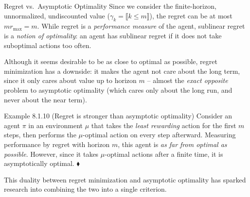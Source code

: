\documentclass[aspectratio=169,10pt]{beamer}
\begin{document}
\begin{frame}{Regret vs.\ Asymptotic Optimality}
  Since we consider the finite-horizon, unnormalized, undiscounted value
  ($\gamma_k=\llbracket k\le m\rrbracket$), the regret can be at most
  $mr_{\max}=m$. While regret is a \emph{performance measure} of the
  agent, sublinear regret is a \emph{notion of optimality}: an agent has
  sublinear regret if it does not take suboptimal actions too often.

  \bigskip
  Although it seems desirable to be as close to optimal as possible, regret
  minimization has a downside: it makes the agent not care about the long
  term, since it only cares about value up to horizon $m$ -- almost the
  \emph{exact opposite} problem to asymptotic optimality (which cares only
  about the long run, and never about the near term).

  \begin{block}{Example 8.1.10 (Regret is stronger than asymptotic optimality)}
    Consider an agent $\pi$ in an environment $\mu$ that takes the
    \emph{least rewarding} action for the first $m$ steps, then performs the
    $\mu$-optimal action on every step afterward. Measuring performance by
    regret with horizon $m$, this agent is \emph{as far from optimal as
    possible}. However, since it takes $\mu$-optimal actions after a finite
    time, it is asymptotically optimal. $\blacklozenge$
  \end{block}

  \bigskip
  This duality between regret minimization and asymptotic optimality has
  sparked research into combining the two into a single criterion.
\end{frame}
\end{document}
